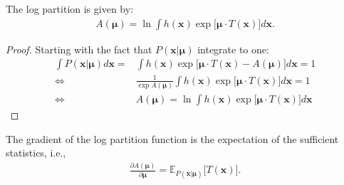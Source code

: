 \documentclass[twoside,11pt]{article}
\begin{document}
\begin{lemma}\label{lemma:log_partition}
The log partition is given by:
\begin{align}
A(\bm{\mu}) = \ln \int h(\bm{x}) \exp \Big[\bm{\mu} \cdot T(\bm{x})\Big] d\bm{x}.
\end{align}
\end{lemma}

\begin{proof}
Starting with the fact that $P(\bm{x}|\bm{\mu})$ integrate to one:
\begin{align}
\int P(\bm{x}|\bm{\mu}) d\bm{x} = &\int h(\bm{x})\exp \Big[\bm{\mu} \cdot T(\bm{x}) - A(\bm{\mu}) \Big] d\bm{x} = 1\\
\Leftrightarrow \quad &\frac{1}{\exp A(\bm{\mu})} \int h(\bm{x})\exp \Big[\bm{\mu} \cdot T(\bm{x}) \Big] d\bm{x} = 1\\
\Leftrightarrow \quad &A(\bm{\mu}) = \ln \int h(\bm{x})\exp \Big[\bm{\mu} \cdot T(\bm{x}) \Big] d\bm{x}
\end{align}
\end{proof}

\begin{lemma}\label{lemma:expectation_gradient}
The gradient of the log partition function is the expectation of the sufficient statistics, i.e.,
\begin{align}
\frac{\partial A(\bm{\mu})}{\partial \bm{\mu}} = \mathbb{E}_{P(\bm{x}|\bm{\mu})}\Big[ T(\bm{x})\Big].
\end{align}
\end{lemma}
\end{document}
